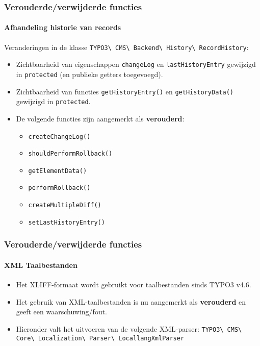 \begin{frame}[fragile]
	\frametitle{Verouderde/verwijderde functies}
	\framesubtitle{Afhandeling historie van records}

	Veranderingen in de klasse
		\smaller
			\texttt{TYPO3\textbackslash
				CMS\textbackslash
				Backend\textbackslash
				History\textbackslash
				RecordHistory}:
		\normalsize

	\begin{itemize}

		\item Zichtbaarheid van eigenschappen \texttt{changeLog} en \texttt{lastHistoryEntry}
			gewijzigd in \texttt{protected} (en publieke getters toegevoegd).
		\item Zichtbaarheid van functies \texttt{getHistoryEntry()} en \texttt{getHistoryData()}
			gewijzigd in \texttt{protected}.
		\item De volgende functies zijn aangemerkt als \textbf{verouderd}:

			\begin{itemize}\smaller
				\item \texttt{createChangeLog()}
				\item \texttt{shouldPerformRollback()}
				\item \texttt{getElementData()}
				\item \texttt{performRollback()}
				\item \texttt{createMultipleDiff()}
				\item \texttt{setLastHistoryEntry()}
			\end{itemize}\normalsize

	\end{itemize}

\end{frame}


\begin{frame}[fragile]
	\frametitle{Verouderde/verwijderde functies}
	\framesubtitle{XML Taalbestanden}

	\begin{itemize}
		\item Het XLIFF-formaat wordt gebruikt voor taalbestanden sinds TYPO3 v4.6.
		\item Het gebruik van XML-taalbestanden is nu aangemerkt als \textbf{verouderd}
			en geeft een waarschuwing/fout.
		\item Hieronder valt het uitvoeren van de volgende XML-parser:\newline
			\small
				\texttt{TYPO3\textbackslash
					CMS\textbackslash
					Core\textbackslash
					Localization\textbackslash
					Parser\textbackslash
					LocallangXmlParser}
			\normalsize
	\end{itemize}

\end{frame}

